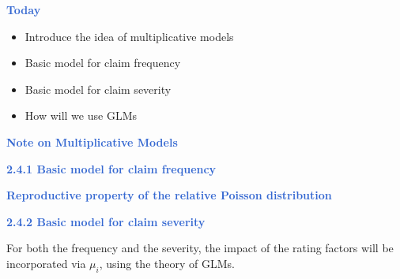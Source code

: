 \documentclass[aspectratio=169,professionalfonts,mathserif,handout]{beamer}
\newcommand{\highlight}[1]{\textcolor{Highlight}{\bf #1}}
\renewcommand{\(}{\left(}
\renewcommand{\)}{\right)}
\renewcommand{\[}{\left[}
\renewcommand{\]}{\right]}
\newcommand{\mytitle}[1]{\vspace*{-1mm}%
  \centerline{\highlight{\Large #1}}\vspace*{3mm}}
\newenvironment{slidebox}{%
  \begin{minipage}[c][7.5cm][t]{14.4cm}\raggedright}{%
  \end{minipage}}
\begin{document}
\begin{frame}\begin{slidebox}
\mytitle{Today}

\begin{itemize}
    \item Introduce the idea of multiplicative models
    \pause
    \item Basic model for claim frequency
    \pause
    \item Basic model for claim severity
    \pause
    \item How will we use GLMs

\end{itemize}
\end{slidebox}\end{frame}

\begin{frame}\begin{slidebox}
\mytitle{Note on Multiplicative Models}
\end{slidebox}\end{frame}

\begin{frame}\begin{slidebox}
\mytitle{2.4.1 Basic model for claim frequency}
\end{slidebox}\end{frame}

\begin{frame}\begin{slidebox}
\mytitle{Reproductive property of the relative Poisson distribution}
\end{slidebox}\end{frame}


\begin{frame}\begin{slidebox}
\mytitle{2.4.2 Basic model for claim severity}

For both the frequency and the severity, the impact of the rating factors will be incorporated via $\mu_i$, using the theory of GLMs.
\end{slidebox}\end{frame}
\end{document}
